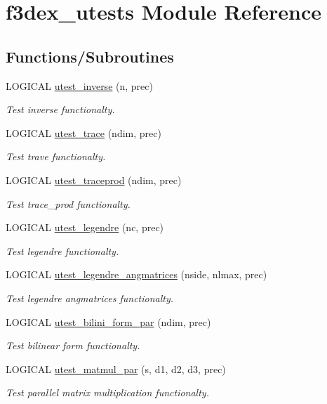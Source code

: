 \hypertarget{namespacef3dex__utests}{
\section{f3dex\_\-utests Module Reference}
\label{namespacef3dex__utests}
}
\subsection*{Functions/Subroutines}
\begin{DoxyCompactItemize}
\item 
LOGICAL \hyperlink{namespacef3dex__utests_a1ac11b22f78f0d83a22ab998cc2e1112}{utest\_\-inverse} (n, prec)
\begin{DoxyCompactList}\small\item\em Test inverse functionalty. \end{DoxyCompactList}\item 
LOGICAL \hyperlink{namespacef3dex__utests_a9afe88e0ae4f7e4e96f5f6c4516310d9}{utest\_\-trace} (ndim, prec)
\begin{DoxyCompactList}\small\item\em Test trave functionalty. \end{DoxyCompactList}\item 
LOGICAL \hyperlink{namespacef3dex__utests_aaa91fc8ed84fd3255d97e9b51f2cb970}{utest\_\-traceprod} (ndim, prec)
\begin{DoxyCompactList}\small\item\em Test trace\_\-prod functionalty. \end{DoxyCompactList}\item 
LOGICAL \hyperlink{namespacef3dex__utests_a0bd9e3f3f7857cd59dd4787f27053ed2}{utest\_\-legendre} (nc, prec)
\begin{DoxyCompactList}\small\item\em Test legendre functionalty. \end{DoxyCompactList}\item 
LOGICAL \hyperlink{namespacef3dex__utests_a57da44b855f549d74b66e6f5766ad969}{utest\_\-legendre\_\-angmatrices} (nside, nlmax, prec)
\begin{DoxyCompactList}\small\item\em Test legendre angmatrices functionalty. \end{DoxyCompactList}\item 
LOGICAL \hyperlink{namespacef3dex__utests_a711e4fe7b4894dfb823cfaede48d377d}{utest\_\-bilini\_\-form\_\-par} (ndim, prec)
\begin{DoxyCompactList}\small\item\em Test bilinear form functionalty. \end{DoxyCompactList}\item 
LOGICAL \hyperlink{namespacef3dex__utests_af92f9fe6f9ec9dade31e9fc47ea73551}{utest\_\-matmul\_\-par} (s, d1, d2, d3, prec)
\begin{DoxyCompactList}\small\item\em Test parallel matrix multiplication functionalty. \end{DoxyCompactList}\end{DoxyCompactItemize}


